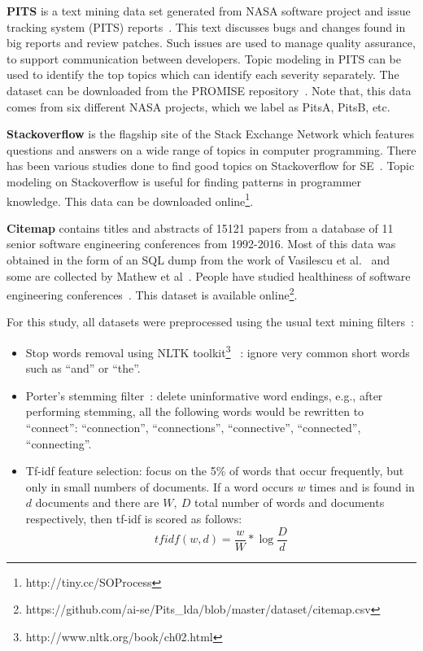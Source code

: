 \documentclass[twocolumn,5p,sort&compress]{elsarticle}
\newcommand{\bi}{\begin{itemize}}
\newcommand{\ei}{\end{itemize}}
\theoremstyle{break}
\begin{document}
\textbf{PITS} is a text mining data set generated from NASA software project
and issue tracking system (PITS) reports~\cite{menzies2008improving, menzies2008automated}. This text discusses
bugs and changes found in big reports and  review patches.
Such issues are used
to manage quality assurance, to support communication
between developers. Topic modeling in PITS can be used
to identify the top topics which can
identify each severity separately. The dataset can be downloaded from the
PROMISE
repository~\cite{promiserepo}. Note that, this data comes from six different
NASA projects, which we label as PitsA, PitsB, etc.
    
 \textbf{Stackoverflow} is the flagship site of the Stack Exchange Network which
 features questions and answers on a wide range of topics in computer
 programming. There has been various studies done to find good topics on Stackoverflow for SE~\cite{barua2014developers,linares2013exploratory, allamanis2013and,rosen2016mobile}.
Topic modeling on Stackoverflow is useful for finding patterns in programmer knowledge.
 This data can be downloaded online\footnote{http://tiny.cc/SOProcess}. 
    
  \textbf{Citemap} contains titles and abstracts of 15121 papers from a
 database of 11 senior software engineering conferences from 1992-2016. Most of this data was
 obtained in the form of an SQL dump from the work of Vasilescu et
 al.~\cite{vasilescu2013historical} and some are collected by Mathew et al~\cite{mathew2017trends}. People have studied healthiness of software engineering conferences~\cite{vasilescu2014healthy}. This dataset is available online\footnote{https://github.com/ai-se/Pits\_lda/blob/master/dataset/citemap.csv}.

  For this study, all  datasets were preprocessed using the usual text mining filters~\cite{feldman2006j}:
\bi
\item
  Stop words removal using NLTK toolkit\footnote{http://www.nltk.org/book/ch02.html}~\cite{bird2006nltk} : ignore very common short words such as  ``and'' or ``the''.
\item
  Porter's stemming filter~\cite{Porter1980}: delete uninformative word endings, e.g., after performing stemming, all the following words would be rewritten
  to ``connect'': ``connection'', ``connections'',
``connective'',          
``connected'',
  ``connecting''.
\item
  Tf-idf feature selection: focus on the 5\% of words that occur frequently,
  but only in small numbers of documents. If a word occurs $w$ times
  and is found in $d$ documents  and there
  are $W,\ D$ total number of words and documents respectively, then tf-idf is scored
  as follows:
  \[
  \mathit{tfidf}(w,d)=   \frac{w}{W} *\log{\frac{D}{d}}\]
  \ei
\end{document}
